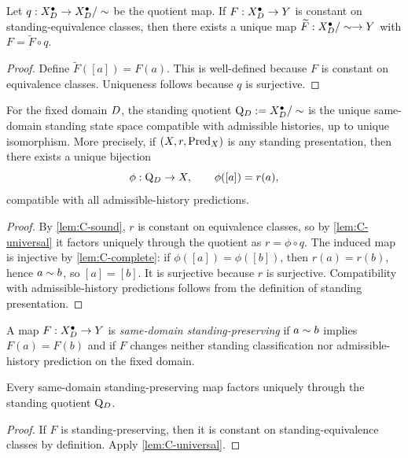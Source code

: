 \begin{lemma}
\label{lem:C-universal}
Let $q:X_D^{\bullet}\to X_D^{\bullet}/\sim$ be the quotient map. If $F:X_D^{\bullet}\to Y$ is constant on standing-equivalence classes, then there exists a unique map $\widetilde F:X_D^{\bullet}/\sim\to Y$ with $F=\widetilde F\circ q$.
\end{lemma}

\begin{proof}
Define $\widetilde F([a])=F(a)$. This is well-defined because $F$ is constant on equivalence classes. Uniqueness follows because $q$ is surjective.
\end{proof}

\begin{theorem}
\label{thm:C-quotient-unique}
For the fixed domain $D$, the standing quotient $\mathrm{Q}_D:=X_D^{\bullet}/\sim$ is the unique same-domain standing state space compatible with admissible histories, up to unique isomorphism. More precisely, if $(X,r,\mathrm{Pred}_X)$ is any standing presentation, then there exists a unique bijection
\[
\phi:\mathrm{Q}_D\to X,
\qquad \phi([a])=r(a),
\]
compatible with all admissible-history predictions.
\end{theorem}

\begin{proof}
By \cref{lem:C-sound}, $r$ is constant on equivalence classes, so by \cref{lem:C-universal} it factors uniquely through the quotient as $r=\phi\circ q$. The induced map is injective by \cref{lem:C-complete}: if $\phi([a])=\phi([b])$, then $r(a)=r(b)$, hence $a\sim b$, so $[a]=[b]$. It is surjective because $r$ is surjective. Compatibility with admissible-history predictions follows from the definition of standing presentation.
\end{proof}

\begin{definition}
A map $F:X_D^{\bullet}\to Y$ is \emph{same-domain standing-preserving} if $a\sim b$ implies $F(a)=F(b)$ and if $F$ changes neither standing classification nor admissible-history prediction on the fixed domain.
\end{definition}

\begin{theorem}
\label{thm:C-factor}
Every same-domain standing-preserving map factors uniquely through the standing quotient $\mathrm{Q}_D$.
\end{theorem}

\begin{proof}
If $F$ is standing-preserving, then it is constant on standing-equivalence classes by definition. Apply \cref{lem:C-universal}.
\end{proof}

